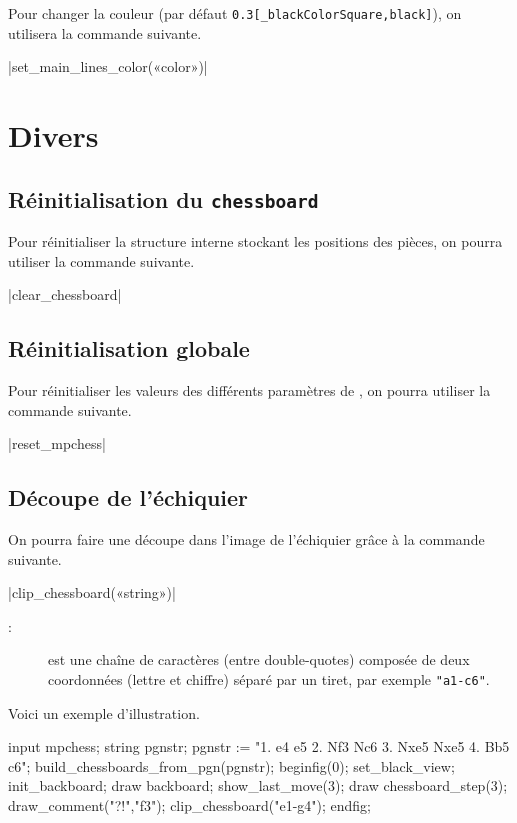 \documentclass[french]{ltxdoc}
\begin{document}
Pour changer la couleur (par défaut \lstinline+0.3[_blackColorSquare,black]+),
on utilisera la commande suivante. 

\commande|set_main_lines_color(«color»)|\smallskip
\section{Divers}

\subsection{Réinitialisation du \lstinline+chessboard+}

Pour réinitialiser la structure interne stockant les positions des pièces, on
pourra utiliser la commande suivante.

\commande|clear_chessboard|\smallskip


\subsection{Réinitialisation globale}

Pour réinitialiser les valeurs des différents paramètres de \mpchess, on pourra
utiliser la commande suivante.

\commande|reset_mpchess|\smallskip


\subsection{Découpe de l’échiquier}

On pourra faire une découpe dans l’image de l’échiquier grâce à la commande suivante.

\commande|clip_chessboard(«string»)|\smallskip


\begin{description}
\item[:] est une chaîne de caractères (entre double-quotes)
composée de deux coordonnées (lettre et chiffre) séparé par un tiret, par
exemple \lstinline+"a1-c6"+.
\end{description}

Voici un exemple d’illustration.
\begin{ExempleMP}
input mpchess;
string pgnstr;
pgnstr := "1. e4 e5 2. Nf3 Nc6 3. Nxe5 Nxe5 4. Bb5 c6";
build_chessboards_from_pgn(pgnstr);
beginfig(0);
set_black_view;
init_backboard;
draw backboard;
show_last_move(3);
draw chessboard_step(3); %
draw_comment("?!","f3");
clip_chessboard("e1-g4");
endfig;
\end{ExempleMP}
\end{document}
